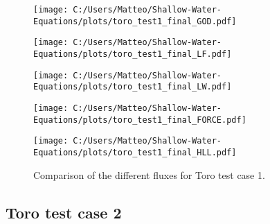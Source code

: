 \begin{figure}[H]
    \centering
    \begin{minipage}{0.45\textwidth}
        \centering
        \texttt{[image: C:/Users/Matteo/Shallow-Water-Equations/plots/toro\_test1\_final\_GOD.pdf]}
    \end{minipage}%
    \hfill
    \begin{minipage}{0.45\textwidth}
        \centering
        \texttt{[image: C:/Users/Matteo/Shallow-Water-Equations/plots/toro\_test1\_final\_LF.pdf]}
    \end{minipage}

    \vspace{0.5cm} %
    
    \begin{minipage}{0.45\textwidth}
        \centering
        \texttt{[image: C:/Users/Matteo/Shallow-Water-Equations/plots/toro\_test1\_final\_LW.pdf]}
    \end{minipage}%
    \hfill
    \begin{minipage}{0.45\textwidth}
        \centering
        \texttt{[image: C:/Users/Matteo/Shallow-Water-Equations/plots/toro\_test1\_final\_FORCE.pdf]}
    \end{minipage}

    \vspace{0.5cm} %
    
    \begin{minipage}{0.45\textwidth}
        \centering
        \texttt{[image: C:/Users/Matteo/Shallow-Water-Equations/plots/toro\_test1\_final\_HLL.pdf]}
    \end{minipage}
    \caption{Comparison of the different fluxes for Toro test case 1.}\label{fig:toro_test1_fluxes}
\end{figure}


\subsection{Toro test case 2}\label{app:toro_test_case_2}


